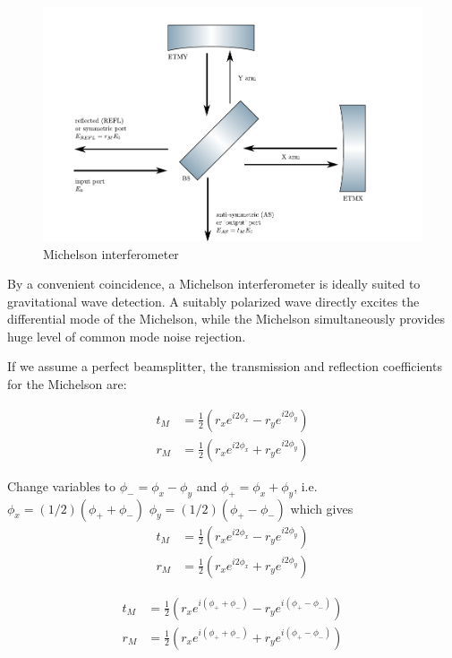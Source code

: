 \begin{figure}
\includegraphics{figures/michelson.pdf}
\caption{\label{fig:michelson}Michelson interferometer}
\end{figure}

By a convenient coincidence, a Michelson interferometer is ideally
suited to gravitational wave detection.  A suitably polarized wave
directly excites the differential mode of the Michelson, while the
Michelson simultaneously provides huge level of common mode noise
rejection.

If we assume a perfect beamsplitter, the transmission and reflection
coefficients for the Michelson are:

\begin{align}
t_M  &= \frac{1}{2}\left(r_x e^{i2\phi_x} - r_y e^{i2\phi_y} \right) \\
r_M  &= \frac{1}{2}\left(r_x e^{i2\phi_x} + r_y e^{i2\phi_y} \right)
\end{align}

Change variables to 
$\phi_- = \phi_x - \phi_y$ and 
$\phi_+ = \phi_x + \phi_y$, i.e. 
%
$\phi_x = (1/2)\left(\phi_+ + \phi_-\right)$
$\phi_y = (1/2)\left(\phi_+ - \phi_-\right)$
which gives
\begin{align}
t_M  &= \frac{1}{2}\left(r_x e^{i2\phi_x} - r_y e^{i2\phi_y} \right) \\
r_M  &= \frac{1}{2}\left(r_x e^{i2\phi_x} + r_y e^{i2\phi_y} \right)
\end{align}

\begin{align}
t_M  &= \frac{1}{2}\left(r_x e^{i\left(\phi_+ + \phi_- \right)} - r_y e^{i\left(\phi_+ - \phi_-\right)} \right) \\
r_M  &= \frac{1}{2}\left(r_x e^{i\left(\phi_+ + \phi_- \right)} + r_y e^{i\left(\phi_+ - \phi_-\right)} \right) 
\end{align}

